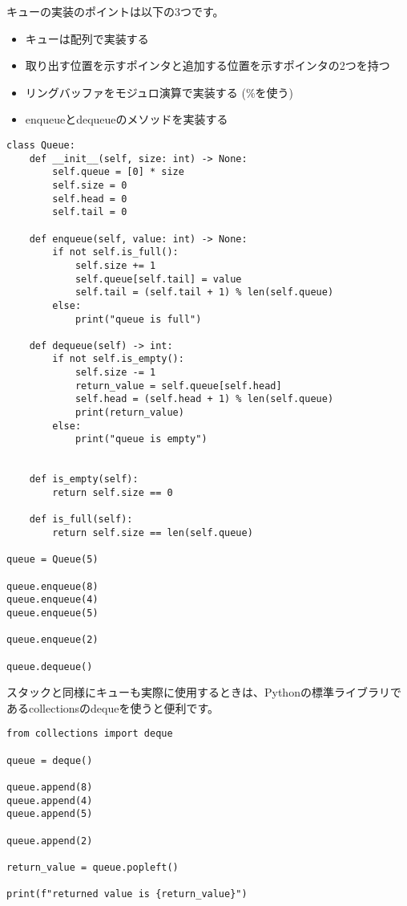 キューの実装のポイントは以下の3つです。
\begin{itemize}
	\item キューは配列で実装する
	\item 取り出す位置を示すポインタと追加する位置を示すポインタの2つを持つ
	\item リングバッファをモジュロ演算で実装する (\%を使う)
	\item enqueueとdequeueのメソッドを実装する
\end{itemize}

\begin{lstlisting}[caption=キューの実装, frame=TRBL, label={queue}]
	class Queue:
    def __init__(self, size: int) -> None:
        self.queue = [0] * size
        self.size = 0
        self.head = 0
        self.tail = 0
        
    def enqueue(self, value: int) -> None:
        if not self.is_full():
            self.size += 1
            self.queue[self.tail] = value
            self.tail = (self.tail + 1) % len(self.queue)
        else:
            print("queue is full")
    
    def dequeue(self) -> int:
        if not self.is_empty():
            self.size -= 1
            return_value = self.queue[self.head]
            self.head = (self.head + 1) % len(self.queue)
            print(return_value)
        else:
            print("queue is empty")
        
    
    def is_empty(self):
        return self.size == 0

    def is_full(self):
        return self.size == len(self.queue)

queue = Queue(5)

queue.enqueue(8)
queue.enqueue(4)
queue.enqueue(5)

queue.enqueue(2)

queue.dequeue()

\end{lstlisting}

\begin{tcolorbox}[enhanced, title=Column2 collections.deque, breakable, colback=white, drop fuzzy shadow, attach boxed title to top center={yshift*=0.1cm}]
	スタックと同様にキューも実際に使用するときは、Pythonの標準ライブラリであるcollectionsのdequeを使うと便利です。
	
	\begin{lstlisting}[frame=TRBL]
		from collections import deque

queue = deque()

queue.append(8)
queue.append(4)
queue.append(5)

queue.append(2)

return_value = queue.popleft()

print(f"returned value is {return_value}")
	\end{lstlisting}
\end{tcolorbox}

